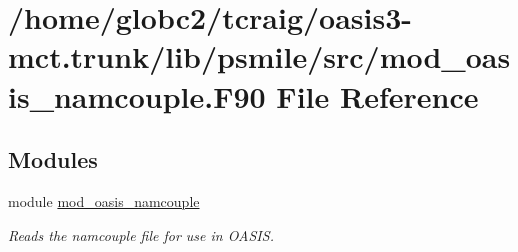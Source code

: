 \hypertarget{mod__oasis__namcouple_8_f90}{}\section{/home/globc2/tcraig/oasis3-\/mct.trunk/lib/psmile/src/mod\+\_\+oasis\+\_\+namcouple.F90 File Reference}
\label{mod__oasis__namcouple_8_f90}
\subsection*{Modules}
\begin{DoxyCompactItemize}
\item 
module \hyperlink{namespacemod__oasis__namcouple}{mod\+\_\+oasis\+\_\+namcouple}
\begin{DoxyCompactList}\small\item\em Reads the namcouple file for use in O\+A\+S\+IS. \end{DoxyCompactList}\end{DoxyCompactItemize}
